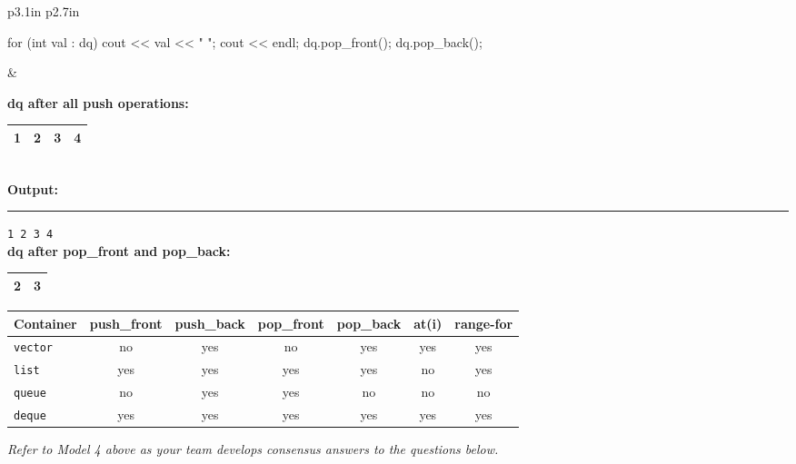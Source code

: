 \begin{center}
\begin{tabular}{p{3.1in} p{2.7in}}
\begin{minipage}{3.1in}
\begin{cpplst}
for (int val : dq) {
    cout << val << " ";
}
cout << endl;
dq.pop_front();
dq.pop_back();
        \end{cpplst}
      \end{minipage}
      &
      \begin{minipage}{2.7in}
        \vskip 6pt
        {\bf dq after all push operations:}\\[4pt]
        \begin{tabular}{|c|c|c|c|}
          \hline
          1 & 2 & 3 & 4 \\
          \hline
        \end{tabular}\\[8pt]
        {\bf Output:}
        \hrule\vskip 5pt
        {\tt 1 2 3 4}\\[8pt]
        {\bf dq after pop\_front and pop\_back:}\\[4pt]
        \begin{tabular}{|c|c|}
          \hline
          2 & 3 \\
          \hline
        \end{tabular}
      \end{minipage}
    \end{tabular}
    \vskip 14pt
    \renewcommand{\arraystretch}{1.3}
    \begin{tabular}{|l|c|c|c|c|c|c|}
      \hline
      \rowcolor{orange!20}
      \textbf{Container} & \textbf{push\_front} & \textbf{push\_back} & \textbf{pop\_front} & \textbf{pop\_back} & \textbf{at(i)} & \textbf{range-for} \\
      \hline
      \tt vector & no  & yes & no  & yes & yes & yes \\
      \hline
      \tt list   & yes & yes & yes & yes & no  & yes \\
      \hline
      \tt queue  & no  & yes & yes & no  & no  & no  \\
      \hline
      \tt deque  & yes & yes & yes & yes & yes & yes \\
      \hline
    \end{tabular}
  \end{center}

  {\it\large Refer to Model 4 above as your team develops consensus answers
    to the questions below.}


